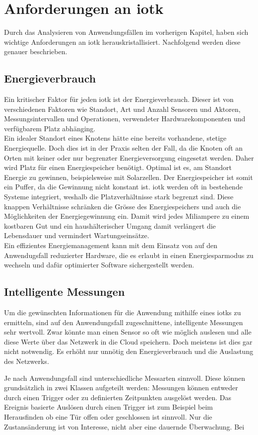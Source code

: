\chapter{Anforderungen an \gls{iotk}}

Durch das Analysieren von Anwendungsfällen im vorherigen Kapitel, haben sich wichtige Anforderungen an \gls{iotk} herauskristallisiert. Nachfolgend werden diese genauer beschrieben.

\section{Energieverbrauch}

Ein kritischer Faktor für jeden \gls{iotk} ist der Energieverbrauch. Dieser ist von verschiedenen Faktoren wie Standort, Art und Anzahl Sensoren und Aktoren, Messungsintervallen und Operationen, verwendeter Hardwarekomponenten und verfügbarem Platz abhänging.\\
Ein idealer Standort eines Knotens hätte eine bereits vorhandene, stetige Energiequelle. Doch dies ist in der Praxis selten der Fall, da die Knoten oft an Orten mit keiner oder nur begrenzter Energieversorgung eingesetzt werden. Daher wird Platz für einen Energiespeicher benötigt. Optimal ist es, am Standort Energie zu gewinnen, beispielsweise mit Solarzellen. Der Energiespeicher ist somit ein Puffer, da die Gewinnung nicht konstant ist. \gls{iotk} werden oft in bestehende Systeme integriert, weshalb die Platzverhältnisse stark begrenzt sind. Diese knappen Verhältnisse schränken die Grösse des Energiespeichers und auch die Möglichkeiten der Energiegewinnung ein. Damit wird jedes Miliampere zu einem kostbaren Gut und ein haushälterischer Umgang damit verlängert die Lebensdauer und vermindert Wartungseinsätze.\\
Ein effizientes Energiemanagement kann mit dem Einsatz von auf den Anwendugsfall reduzierter Hardware, die es erlaubt in einen Energiesparmodus zu wechseln und dafür optimierter Software sichergestellt werden.

\section{Intelligente Messungen}

Um die gewünschten Informationen für die Anwendung mithilfe eines \glspl{iotk} zu ermitteln, sind auf den Anwendungsfall zugeschnittene, intelligente Messungen sehr wertvoll. Zwar könnte man einen Sensor so oft wie möglich auslesen und alle diese Werte über das Netzwerk in die Cloud speichern. Doch meistens ist dies gar nicht notwendig. Es erhöht nur unnötig den Energieverbrauch und die Auslastung des Netzwerks.

Je nach Anwendungsfall sind unterschiedliche Messarten sinnvoll. Diese können grundsätzlich in zwei Klassen aufgeteilt werden: Messungen können entweder durch einen Trigger oder zu definierten Zeitpunkten ausgelöst werden. Das Ereignis basierte Auslösen durch einen Trigger ist zum Beispiel beim Herausfinden ob eine Tür offen oder geschlossen ist sinnvoll. Nur die Zustansänderung ist von Interesse, nicht aber eine dauernde Überwachung. Bei 

